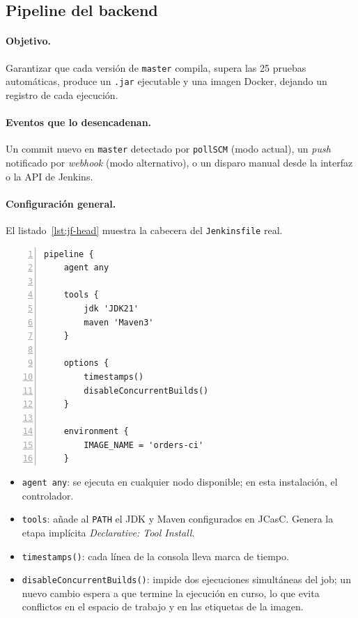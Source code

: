 \documentclass[11pt,a4paper]{article}
\newcommand{\reservar}[1]{\par\vskip 0pt plus #1\penalty-200\vskip 0pt plus -#1\relax}
\begin{document}
\subsection{Pipeline del backend}
\label{sec:pipeline-back}

\paragraph{Objetivo.} Garantizar que cada versión de \texttt{master} compila, supera las 25 pruebas
automáticas, produce un \texttt{.jar} ejecutable y una imagen Docker, dejando un registro de cada
ejecución.

\paragraph{Eventos que lo desencadenan.} Un commit nuevo en \texttt{master} detectado por
\texttt{pollSCM} (modo actual), un \emph{push} notificado por \emph{webhook} (modo alternativo), o un
disparo manual desde la interfaz o la API de Jenkins.

\reservar{9cm}
\paragraph{Configuración general.} El listado~\ref{lst:jf-head} muestra la cabecera del
\texttt{Jenkinsfile} real.

\begin{lstlisting}[language=jenkins,caption={\texttt{Jenkinsfile}, líneas 1--16: agente, herramientas, opciones y entorno.},label={lst:jf-head},numbers=left]
pipeline {
    agent any

    tools {
        jdk 'JDK21'
        maven 'Maven3'
    }

    options {
        timestamps()
        disableConcurrentBuilds()
    }

    environment {
        IMAGE_NAME = 'orders-ci'
    }
\end{lstlisting}

\begin{itemize}[noitemsep]
  \item \texttt{agent any}: se ejecuta en cualquier nodo disponible; en esta instalación, el controlador.
  \item \texttt{tools}: añade al \texttt{PATH} el JDK y Maven configurados en JCasC. Genera la etapa
        implícita \emph{Declarative: Tool Install}.
  \item \texttt{timestamps()}: cada línea de la consola lleva marca de tiempo.
  \item \texttt{disableConcurrentBuilds()}: impide dos ejecuciones simultáneas del job; un nuevo cambio
        espera a que termine la ejecución en curso, lo que evita conflictos en el espacio de trabajo y
        en las etiquetas de la imagen.
\end{itemize}
\end{document}
